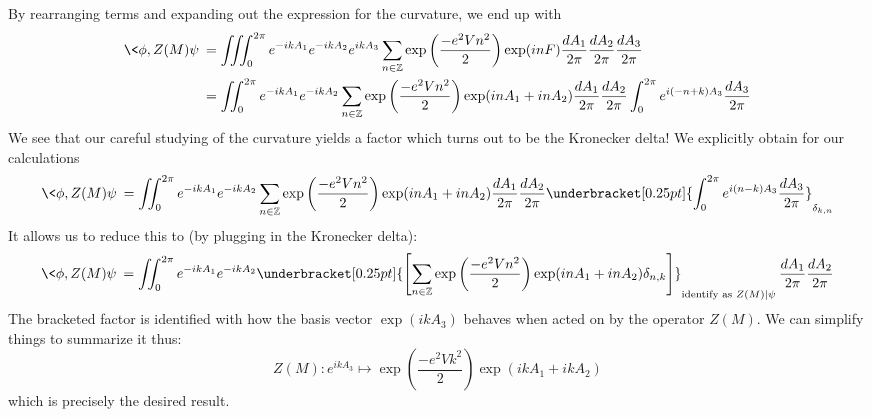 By rearranging terms and expanding out the expression for the
curvature, we end up with
\begin{align*}
\<\phi,Z(M)\psi\> &= \iiint^{2\pi}_{0}e^{-ikA_{1}}e^{-ikA_{2}}e^{ikA_{3}}\sum_{n\in\mathbb{Z}}\exp\left(\frac{-e^{2}Vn^{2}}{2}\right)\exp(inF)\frac{dA_{1}}{2\pi}\frac{dA_{2}}{2\pi}\frac{dA_{3}}{2\pi}\\
&=\iint^{2\pi}_{0}e^{-ikA_{1}}e^{-ikA_{2}}\sum_{n\in\mathbb{Z}}\exp\left(\frac{-e^{2}Vn^{2}}{2}\right)\exp(inA_{1}+inA_{2})\frac{dA_{1}}{2\pi}\frac{dA_{2}}{2\pi}\int^{2\pi}_{0}e^{i(-n+k)A_{3}}\frac{dA_{3}}{2\pi}
\end{align*}
We see that our careful studying of the curvature yields a factor
which turns out to be the Kronecker delta! We explicitly obtain for our calculations
\begin{equation}%
\<\phi,Z(M)\psi\> = \iint^{2\pi}_{0}e^{-ikA_{1}}e^{-ikA_{2}}\sum_{n\in\mathbb{Z}}\exp\left(\frac{-e^{2}Vn^{2}}{2}\right)\exp(inA_{1}+inA_{2})\frac{dA_{1}}{2\pi}\frac{dA_{2}}{2\pi}\underbracket[0.25pt]{\int^{2\pi}_{0}e^{i(n-k)A_{3}}\frac{dA_{3}}{2\pi}}_{\delta_{k,n}}
\end{equation}
It allows us to reduce this to (by plugging  in the Kronecker
delta):
\begin{equation}%
\<\phi,Z(M)\psi\> =
\iint^{2\pi}_{0}e^{-ikA_{1}}e^{-ikA_{2}}\underbracket[0.25pt]{\left[\sum_{n\in\mathbb{Z}}\exp\left(\frac{-e^{2}Vn^{2}}{2}\right)\exp(inA_{1}+inA_{2})\delta_{n,k}\right]}_{\text{identify as }Z(M)|\psi\>}\frac{dA_{1}}{2\pi}\frac{dA_{2}}{2\pi}
\end{equation}
The bracketed factor is identified with how the basis vector
$\exp(ikA_{3})$ behaves when acted on by the operator $Z(M)$. We
can simplify things to summarize it thus:
\begin{equation}%
Z(M):e^{ikA_{3}}\mapsto \exp\left(\frac{-e^{2}Vk^{2}}{2}\right)\exp(ikA_{1}+ikA_{2})
\end{equation}
which is precisely the desired result.
